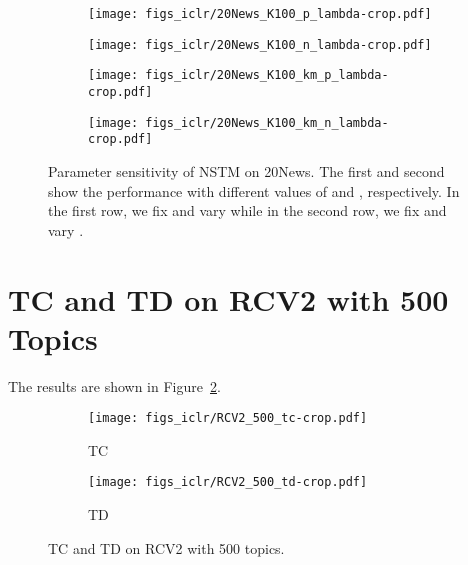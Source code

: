\documentclass{article}
\begin{document}
\begin{figure}[t]
         \begin{subfigure}[b]{0.16\linewidth}
                 \centering
                 \texttt{[image: figs\_iclr/20News\_K100\_p\_lambda-crop.pdf]}
         \end{subfigure}\begin{subfigure}[b]{0.16\linewidth}
                 \centering
                 \texttt{[image: figs\_iclr/20News\_K100\_n\_lambda-crop.pdf]}
         \end{subfigure}
          \begin{subfigure}[b]{0.16\linewidth}
                 \centering
                 \texttt{[image: figs\_iclr/20News\_K100\_km\_p\_lambda-crop.pdf]}
         \end{subfigure}
                  \begin{subfigure}[b]{0.16\linewidth}
                 \centering
                 \texttt{[image: figs\_iclr/20News\_K100\_km\_n\_lambda-crop.pdf]}
         \end{subfigure}
\caption{Parameter sensitivity of NSTM on 20News. The first and second show the performance with different values of  and , respectively. In the first row, we fix  and vary  while in the second row, we fix  and vary .}
\label{fig-parameter}
\end{figure}


\section{TC and TD on RCV2 with 500 Topics}
\label{a-sec-rcv-500}
The results are shown in Figure~\ref{fig-rcv-500}.


\begin{figure}[t]
        \centering
         \begin{subfigure}[b]{0.45\linewidth}
                 \centering
                 \caption{TC}
                 \texttt{[image: figs\_iclr/RCV2\_500\_tc-crop.pdf]}
         \end{subfigure}
          \hspace{0.0005\textwidth}
         \begin{subfigure}[b]{0.45\linewidth}
                 \centering
                 \caption{TD}
                 \texttt{[image: figs\_iclr/RCV2\_500\_td-crop.pdf]}
         \end{subfigure} 
\caption{TC and TD on RCV2 with 500 topics.}
\label{fig-rcv-500}
\end{figure}
\end{document}
